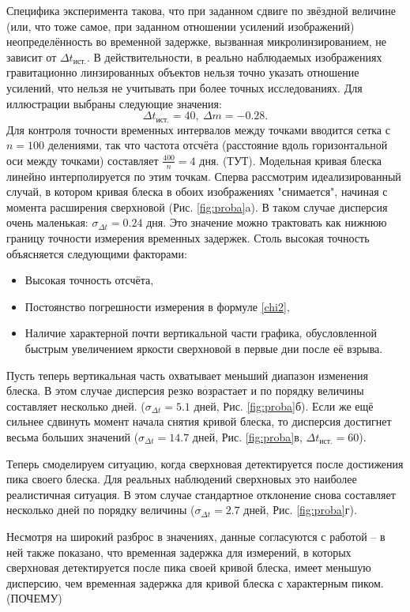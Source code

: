 Специфика эксперимента такова, что при заданном сдвиге по звёздной величине (или, что тоже самое, при заданном отношении усилений изображений) неопределённость во временной задержке, вызванная микролинзированием, не зависит от $\Delta t_{\textrm{ист.}}$. В действительности, в реально наблюдаемых изображениях гравитационно линзированных объектов нельзя точно указать отношение усилений, что нельзя не учитывать при более точных исследованиях. Для иллюстрации выбраны следующие значения: $$\Delta t_{\textrm{ист.}}=40, \ \Delta m = -0.28.$$
Для контроля точности временных интервалов между точками вводится сетка с $n=100$ делениями, так что частота отсчёта (расстояние вдоль горизонтальной оси между точками) составляет $\frac{400}{n}=4$ дня. (ТУТ). Модельная кривая блеска линейно интерполируется по этим точкам.
Сперва рассмотрим идеализированный случай, в котором кривая блеска в обоих изображениях "снимается", начиная с момента расширения сверхновой (Рис. \ref{fig:proba}a). В таком случае дисперсия очень маленькая: $\sigma_{\Delta t}=0.24$ дня. Это значение можно трактовать как нижнюю границу точности измерения временных задержек. Столь высокая точность объясняется следующими факторами: 

\begin{itemize}
    \item Высокая точность отсчёта,
    \item Постоянство погрешности измерения в формуле \eqref{chi2},
    \item Наличие характерной почти вертикальной части графика, обусловленной быстрым увеличением яркости сверхновой в первые дни после её взрыва.
\end{itemize}

Пусть теперь вертикальная часть охватывает меньший диапазон изменения блеска. В этом случае дисперсия резко возрастает и по порядку величины составляет несколько дней. ($\sigma_{\Delta t}=5.1$ дней, Рис. \ref{fig:proba}б). Если же ещё сильнее сдвинуть момент начала снятия кривой блеска, то дисперсия достигнет весьма больших значений ($\sigma_{\Delta t}=14.7$ дней, Рис. \ref{fig:proba}в, $\Delta t_{\textrm{ист.}}=60$).

Теперь смоделируем ситуацию, когда сверхновая детектируется после достижения пика своего блеска. Для реальных наблюдений сверхновых это наиболее реалистичная ситуация. В этом случае стандартное отклонение снова составляет несколько дней по порядку величины ($\sigma_{\Delta t}=2.7$ дней, Рис. \ref{fig:proba}г). 

Несмотря на широкий разброс в значениях, данные согласуются с работой \cite{doblerkeeton2006} -- в ней также показано, что временная задержка для измерений, в которых сверхновая детектируется после пика своей кривой блеска, имеет меньшую дисперсию, чем временная задержка для кривой блеска с характерным пиком. (ПОЧЕМУ)

